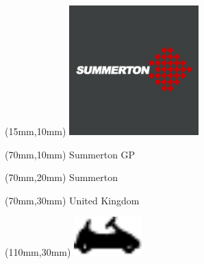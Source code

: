 \null\newpage
\begin{textblock*}{50mm}(15mm,10mm)%
\includegraphics[width=50mm]{LG/SUMM.png}
\end{textblock*}
\begin{textblock*}{130mm}(70mm,10mm)%
{\fontsize{20}{20}\selectfont Summerton GP}\\
\end{textblock*}
\begin{textblock*}{120mm}(70mm,20mm)%
{\fontsize{16}{16}\selectfont Summerton}\\
\end{textblock*}
\begin{textblock*}{120mm}(70mm,30mm)%
{\fontsize{12}{12}\selectfont United Kingdom}
\end{textblock*}
\begin{textblock*}{30mm}(110mm,30mm)%
\centering
\includegraphics[height=15mm]{icons/kart.pdf}
\end{textblock*}
